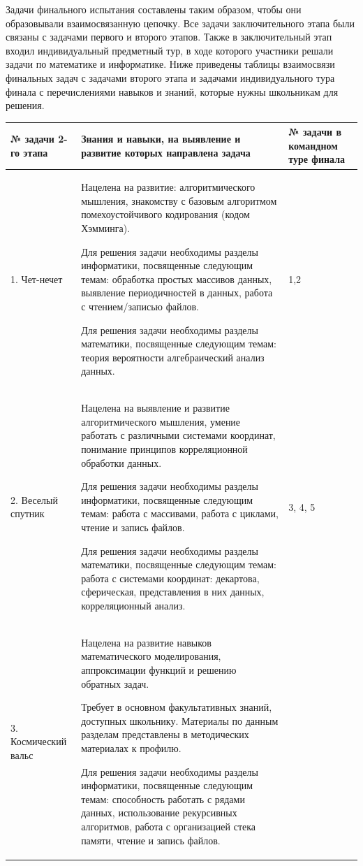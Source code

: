 Задачи финального испытания составлены таким образом, чтобы они образовывали взаимосвязанную цепочку. Все задачи заключительного этапа были связаны с задачами первого и второго этапов. Также в заключительный этап входил индивидуальный предметный тур, в ходе которого участники решали задачи по математике и информатике. Ниже приведены таблицы взаимосвязи финальных задач с задачами второго этапа и задачами индивидуального тура финала с перечислениями навыков и знаний, которые нужны школьникам для решения. 
\begin{center}
\small
\begin{longtable}{|p{2cm}|p{11cm}|p{2cm}|}
\hline
\textbf{№ задачи 2-го этапа} & \textbf{ Знания и навыки, на выявление и развитие которых
направлена задача} & \textbf{№ задачи в командном туре финала} \\
\hline
1. Чет-нечет & Нацелена на развитие: алгоритмического мышления, знакомству с базовым алгоритмом помехоустойчивого кодирования (кодом Хэмминга).

Для решения задачи необходимы разделы информатики, посвященные следующим темам:
обработка простых массивов данных, выявление периодичностей в данных, работа с чтением/записью файлов.

Для решения задачи необходимы разделы математики, посвященные следующим темам: теория вероятности алгебраический анализ данных.
& 1,2 \\
\hline
2. Веселый спутник & Нацелена на выявление и развитие алгоритмического мышления, умение работать с различными системами координат, понимание принципов корреляционной обработки данных.

Для решения задачи необходимы разделы информатики, посвященные следующим темам: работа с массивами, работа с циклами, чтение и запись файлов.

Для решения задачи необходимы разделы математики, посвященные следующим темам: работа с системами координат: декартова, сферическая, представления в них данных, корреляционный анализ. & 3, 4, 5 \\
\hline
3. Космический вальс & Нацелена на развитие навыков математического моделирования, аппроксимации функций и решению обратных задач.

Требует в основном факультативных знаний, доступных школьнику. Материалы по данным разделам представлены в методических материалах к профилю.

Для решения задачи необходимы разделы информатики, посвященные следующим темам: способность работать с рядами данных, использование рекурсивных алгоритмов, работа с организацией стека памяти, чтение и запись файлов.


\end{longtable}
\end{center}
